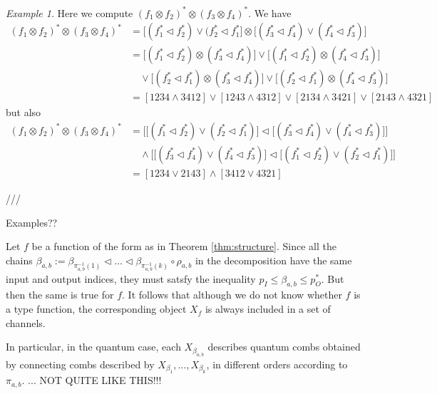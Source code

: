 \documentclass[12pt]{article}
\theoremstyle{definition}
\theoremstyle{remark}
\newtheorem{exm}{Example}
\def\vtl{\vartriangleleft}
\begin{document}
\begin{exm} Here we compute $(f_1\otimes f_2)^*\otimes (f_3\otimes f_4)^*$. We have
\begin{align*}
(f_1\otimes f_2)^*\otimes (f_3\otimes f_4)^*&= \bigl[(f_1^*\vtl f^*_2)\vee (f_2^*\vtl
f_1^*\bigr]\otimes \bigl[(f_3^*\vtl f^*_4)\vee (f_4^*\vtl
f_3^*)\bigr]\\
&= \bigl[(f_1^*\vtl f^*_2)\otimes (f_3^*\vtl f^*_4)\bigr]\vee \bigl[(f_1^*\vtl
f^*_2)\otimes (f_4^*\vtl f^*_3)\bigr]\\
&\quad \vee \bigl[(f_2^*\vtl f^*_1)\otimes (f_3^*\vtl
f^*_4)\bigr]\vee \bigl[(f_2^*\vtl f^*_1)\otimes (f_4^*\vtl f^*_3)\bigr]\\
&=[1234 \wedge 3412]\vee [1243\wedge 4312] \vee [2134\wedge 3421]\vee [2143\wedge 4321]
\end{align*}
but also
\begin{align*}
(f_1\otimes f_2)^*\otimes (f_3\otimes f_4)^*&= \biggl[\bigl[(f_1^*\vtl f^*_2)\vee (f_2^*\vtl
f_1^*)\bigr]\vtl  \bigl[(f_3^*\vtl f^*_4)\vee (f_4^*\vtl
f_3^*)\bigr]\biggr]\\
&\quad\wedge\biggl[\bigl[(f_3^*\vtl f^*_4)\vee (f_4^*\vtl
f_3^*)\bigr]\vtl  \bigl[(f_1^*\vtl f^*_2)\vee (f_2^*\vtl
f_1^*)\bigr]\biggr] \\
&= [1234\vee 2143]\wedge [3412\vee 4321]
\end{align*}




\end{exm}


///

Examples??

Let $f$ be a function of the form as in Theorem \ref{thm:structure}. Since all the chains
$\beta_{a,b}:=\beta_{\pi^{-1}_{a,b}(1)}\vtl \dots \vtl \beta_{\pi^{-1}_{a,b}(k)}\circ
\rho_{a,b}$ in the
decomposition have the same input and  output indices, they must satsfy the inequality
$p_{I}\le \beta_{a,b} \le p_{O}^*$. But then the same is true for $f$.
It follows that although we do not know whether $f$ is a type function, the corresponding
object $X_f$ is always included in a set of channels.

In particular, in the quantum case, each $X_{\beta_{a,b}}$ describes quantum combs  obtained by
connecting combs described by  $X_{\beta_1},\dots, X_{\beta_k}$, in different orders
according to $\pi_{a,b}$. ... NOT QUITE LIKE THIS!!!
\end{document}
